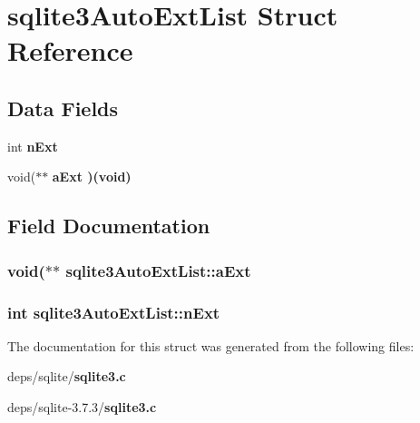 \section{sqlite3Auto\-Ext\-List Struct Reference}
\label{structsqlite3AutoExtList}
\subsection*{Data Fields}
\begin{CompactItemize}
\item 
int \bf{n\-Ext}
\item 
void($\ast$$\ast$ \bf{a\-Ext} )(void)
\end{CompactItemize}


\subsection{Field Documentation}
\subsubsection{\setlength{\rightskip}{0pt plus 5cm}void($\ast$$\ast$ \bf{sqlite3Auto\-Ext\-List::a\-Ext}}\label{structsqlite3AutoExtList_d2bed23e9a73ef01dacca3d1a76f3e5b}


\subsubsection{\setlength{\rightskip}{0pt plus 5cm}int \bf{sqlite3Auto\-Ext\-List::n\-Ext}}\label{structsqlite3AutoExtList_a31168d05076734c3cbd0281a4fcab78}




The documentation for this struct was generated from the following files:\begin{CompactItemize}
\item 
deps/sqlite/\bf{sqlite3.c}\item 
deps/sqlite-3.7.3/\bf{sqlite3.c}\end{CompactItemize}
